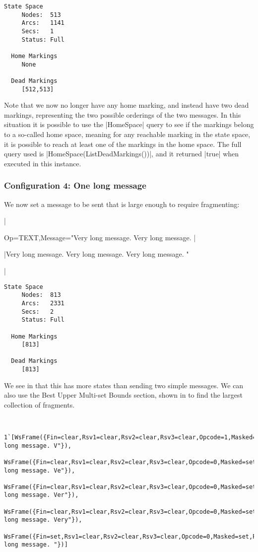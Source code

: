 	\begin{lstlisting}[language={},float,label=lst:ssa_msg_ping,caption=One
	message then one ping]
  State Space
     Nodes:  513
     Arcs:   1141
     Secs:   1
     Status: Full
     
  Home Markings
     None

  Dead Markings
     [512,513]
	\end{lstlisting}
	
	Note that we now no longer have any home marking, and instead have two dead
	markings, representing the two possible orderings of the two messages. In this
	situation it is possible to use the |HomeSpace| query to see if the markings
	belong to a so-called home space, meaning for any reachable marking in the
	state space, it is possible to reach at least one of the markings in the home
	space. The full query used is |HomeSpace(ListDeadMarkings())|, and it returned
	|true| when executed in this instance.
	
	\subsubsection{Configuration 4: One long message}
	We now set a message to be sent that is large enough to require fragmenting:
	
	|{Op=TEXT,Message="Very long message. Very long message. |
	
	|Very long message. Very long message. Very long message. "}|
	
	\begin{lstlisting}[language={},float,label=lst:ssa_long_msg,caption=One long
	message]
  State Space
     Nodes:  813
     Arcs:   2331
     Secs:   2
     Status: Full
     
  Home Markings
     [813]

  Dead Markings
     [813]
	\end{lstlisting}
	We see in  that this has more states than sending two
	simple messages.
	We can also use the Best Upper Multi-set Bounds section, shown in
	 to find the largest collection of fragments. 
	
	\begin{lstlisting}[language={},gobble=1,float,label=lst:ssa_long_msg_frag,caption=Upper
	Multi-set Bounds - long message fragments]
	
	1`[WsFrame({Fin=clear,Rsv1=clear,Rsv2=clear,Rsv3=clear,Opcode=1,Masked=set,Payload_length=20,Masking_key=Mask([0,0,0,0]),Payload="Very long message. V"}),
	WsFrame({Fin=clear,Rsv1=clear,Rsv2=clear,Rsv3=clear,Opcode=0,Masked=set,Payload_length=20,Masking_key=Mask([0,0,0,0]),Payload="ery long message. Ve"}),
	WsFrame({Fin=clear,Rsv1=clear,Rsv2=clear,Rsv3=clear,Opcode=0,Masked=set,Payload_length=20,Masking_key=Mask([0,0,0,0]),Payload="ry long message. Ver"}),
	WsFrame({Fin=clear,Rsv1=clear,Rsv2=clear,Rsv3=clear,Opcode=0,Masked=set,Payload_length=20,Masking_key=Mask([0,0,0,0]),Payload="y long message. Very"}),
	WsFrame({Fin=set,Rsv1=clear,Rsv2=clear,Rsv3=clear,Opcode=0,Masked=set,Payload_length=15,Masking_key=Mask([0,0,0,0]),Payload=" long message. "})]
	\end{lstlisting}
	
